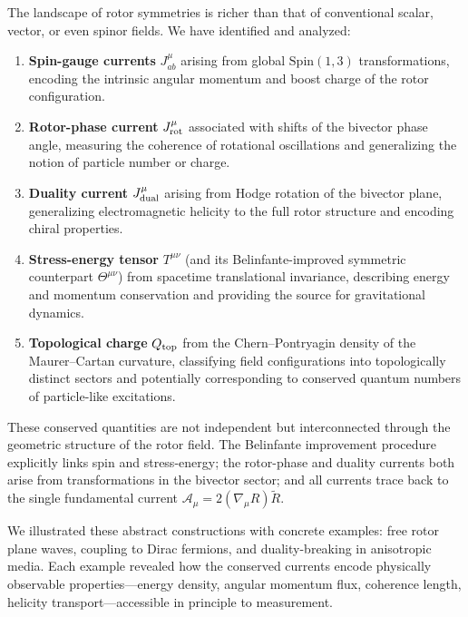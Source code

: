 \documentclass[11pt,a4paper]{article}
\numberwithin{equation}{section}
\theoremstyle{plain}
\theoremstyle{definition}
\theoremstyle{remark}
\begin{document}
The landscape of rotor symmetries is richer than that of conventional scalar, vector, or even spinor fields. We have identified and analyzed:

\begin{enumerate}
  \item \textbf{Spin-gauge currents} $J^\mu_{ab}$ arising from global $\mathrm{Spin}(1,3)$ transformations, encoding the intrinsic angular momentum and boost charge of the rotor configuration.

  \item \textbf{Rotor-phase current} $J^\mu_{\rm rot}$ associated with shifts of the bivector phase angle, measuring the coherence of rotational oscillations and generalizing the notion of particle number or charge.

  \item \textbf{Duality current} $J^\mu_{\rm dual}$ arising from Hodge rotation of the bivector plane, generalizing electromagnetic helicity to the full rotor structure and encoding chiral properties.

  \item \textbf{Stress-energy tensor} $T^{\mu\nu}$ (and its Belinfante-improved symmetric counterpart $\Theta^{\mu\nu}$) from spacetime translational invariance, describing energy and momentum conservation and providing the source for gravitational dynamics.

  \item \textbf{Topological charge} $Q_{\rm top}$ from the Chern--Pontryagin density of the Maurer--Cartan curvature, classifying field configurations into topologically distinct sectors and potentially corresponding to conserved quantum numbers of particle-like excitations.
\end{enumerate}

These conserved quantities are not independent but interconnected through the geometric structure of the rotor field. The Belinfante improvement procedure explicitly links spin and stress-energy; the rotor-phase and duality currents both arise from transformations in the bivector sector; and all currents trace back to the single fundamental current $\mathcal{A}_\mu = 2(\nabla_\mu R)\widetilde{R}$.

We illustrated these abstract constructions with concrete examples: free rotor plane waves, coupling to Dirac fermions, and duality-breaking in anisotropic media. Each example revealed how the conserved currents encode physically observable properties---energy density, angular momentum flux, coherence length, helicity transport---accessible in principle to measurement.
\end{document}
